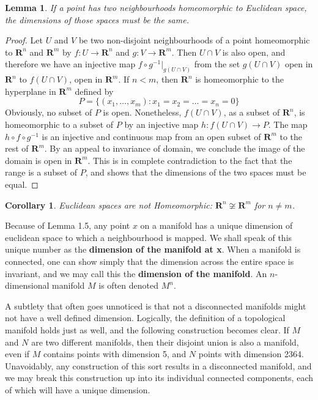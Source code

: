 \documentclass[12pt]{report}
\theoremstyle{plain}
\newtheorem{lemma}[theorem]{Lemma}
\newtheorem{corollary}[theorem]{Corollary}
\theoremstyle{definition}
\begin{document}
\begin{lemma}
    If a point has two neighbourhoods homeomorphic to Euclidean space, the dimensions of those spaces must be the same.
\end{lemma}
\begin{proof}
    Let $U$ and $V$ be two non-disjoint neighbourhoods of a point homeomorphic to $\mathbf{R}^n$ and $\mathbf{R}^m$ by $f:U \to \mathbf{R}^n$ and $g:V \to \mathbf{R}^m$. Then $U \cap V$ is also open, and therefore we have an injective map $f \circ g^{-1}|_{g(U \cap V)}$ from the set $g(U \cap V)$ open in $\mathbf{R}^n$ to $f(U \cap V)$, open in $\mathbf{R}^m$. If $n < m$, then $\mathbf{R}^n$ is homeomorphic to the hyperplane in $\mathbf{R}^m$ defined by
    \[ P = \{ (x_1, \dots, x_m): x_1 = x_2 = \dots = x_n = 0 \} \]
    Obviously, no subset of $P$ is open. Nonetheless, $f(U \cap V)$, as a subset of $\mathbf{R}^n$, is homeomorphic to a subset of $P$ by an injective map $h: f(U \cap V) \to P$. The map $h \circ f \circ g^{-1}$ is an injective and continuous map from an open subset of $\mathbf{R}^m$ to the rest of $\mathbf{R}^m$. By an appeal to invariance of domain, we conclude the image of the domain is open in $\mathbf{R}^m$. This is in complete contradiction to the fact that the range is a subset of $P$, and shows that the dimensions of the two spaces must be equal.
\end{proof}

\begin{corollary}
    Euclidean spaces are not Homeomorphic: $\mathbf{R}^n \not \cong \mathbf{R}^m$ for $n \neq m$.
\end{corollary}

Because of Lemma 1.5, any point $x$ on a manifold has a unique dimension of euclidean space to which a neighbourhood is mapped. We shall speak of this unique number as the {\bf dimension of the manifold at x}. When a manifold is connected, one can show simply that the dimension across the entire space is invariant, and we may call this the {\bf dimension of the manifold}. An $n$-dimensional manifold $M$ is often denoted $M^n$.

A subtlety that often goes unnoticed is that not a disconnected manifolds might not have a well defined dimension. Logically, the definition of a topological manifold holds just as well, and the following construction becomes clear. If $M$ and $N$ are two different manifolds, then their disjoint union is also a manifold, even if $M$ contains points with dimension 5, and $N$ points with dimension 2364. Unavoidably, any construction of this sort results in a disconnected manifold, and we may break this construction up into its individual connected components, each of which will have a unique dimension.
\end{document}
